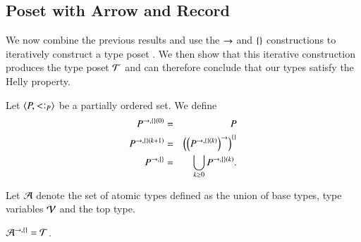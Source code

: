 \documentclass{report}
\begin{document}
  \subsection{Poset with Arrow and Record}
  We now combine the previous results and use the $\rightarrow$ and ${\{\}}$ constructions to
  iteratively construct a type poset . We then show that
  this iterative construction produces the type poset $\mathcal{T}$ 
  and can therefore conclude that our types satisfy the Helly property.
  \begin{dfn}
    Let $\poset{P,\subtype_P}$ be a partially ordered set. We define
    \begin{eqnarray*}
      P^{\rightarrow,{\{\}}(0)} &=& P \\
      P^{\rightarrow,{\{\}}(k+1)} &=& \left({\left({P^{\rightarrow,{\{\}}(k)}}\right)^\rightarrow}\right)^{\{\}} \\
      P^{\rightarrow,{\{\}}} &=& \bigcup_{k\ge 0}P^{\rightarrow,{\{\}}(k)}\textrm{.}
    \end{eqnarray*}
  \end{dfn}
  \begin{dfn}
    Let $\mathcal{A}$ denote the set of atomic types defined as the union of base types,
    type variables $\mathcal{V}$ and the top type.
  \end{dfn}
  \begin{thm}
    $\mathcal{A}^{\rightarrow,{\{\}}}=\mathcal{T}$.
  \end{thm}
\end{document}
